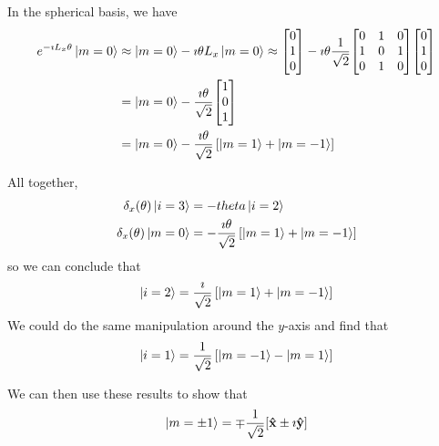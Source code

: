\documentclass[a4paper,twoside,master.tex]{subfiles}
\begin{document}
In the spherical basis, we have
\begin{align}
    e^{- \imath L_x \theta}\ket{m=0} &\approx\ket{m=0} - \imath \theta L_x\ket{m=0} \approx \mqty[0\\1\\0] - \imath \theta \frac{1}{\sqrt{2}} \mqty[0&1&0\\1&0&1\\0&1&0] \mqty[0\\1\\0] \\
    &=\ket{m = 0} - \frac{\imath \theta}{\sqrt{2}} \mqty[1\\0\\1] \\
    &=\ket{m = 0} - \frac{\imath \theta}{\sqrt{2}} \left[\ket{m=1} +\ket{m=-1} \right]
\end{align}

All together,
\begin{align}
    \delta_x(\theta)\ket{i=3} &= -theta\ket{i=2} \\
    \delta_x(\theta)\ket{m=0} &= - \frac{\imath \theta}{\sqrt{2}} \left[\ket{m=1} +\ket{m=-1} \right]
\end{align}
so we can conclude that
\begin{equation}
    \ket{i=2} = \frac{\imath}{\sqrt{2}} \left[\ket{m=1} +\ket{m=-1} \right]
\end{equation}
We could do the same manipulation around the $ y $-axis and find that
\begin{equation}
    \ket{i=1} = \frac{1}{\sqrt{2}} \left[\ket{m=-1} -\ket{m=1} \right]
\end{equation}

We can then use these results to show that
\begin{equation}
    \ket{m = \pm 1} = \mp \frac{1}{\sqrt{2}} [\vu{x} \pm \imath \vu{y}]
\end{equation}
\end{document}
